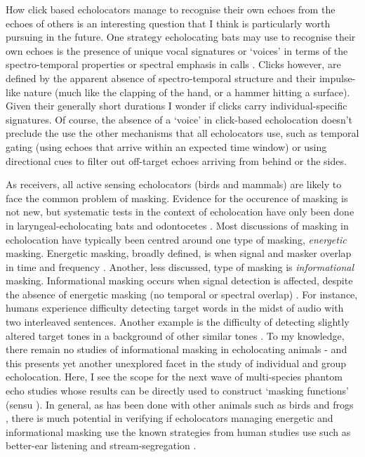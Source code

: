 \documentclass[
]{book}
\begin{document}
How click based echolocators manage to recognise their own echoes from the echoes of others is an interesting question that I think is particularly worth pursuing in the future. One strategy echolocating bats may use to recognise their own echoes is the presence of unique vocal signatures or `voices' in terms of the spectro-temporal properties or spectral emphasis in calls \citep{yovel-a, masters1995sonar}. Clicks however, are defined by the apparent absence of spectro-temporal structure \citep{pye1980echolocation} and their impulse-like nature (much like the clapping of the hand, or a hammer hitting a surface). Given their generally short durations I wonder if clicks carry individual-specific signatures. Of course, the absence of a `voice' in click-based echolocation doesn't preclude the use the other mechanisms that all echolocators use, such as temporal gating (using echoes that arrive within an expected time window) or using directional cues to filter out off-target echoes arriving from behind or the sides.

As receivers, all active sensing echolocators (birds and mammals) are likely to face the common problem of masking. Evidence for the occurence of masking is not new, but systematic tests in the context of echolocation have only been done in laryngeal-echolocating bats and odontocetes \citep{Nachtigall2014}. Most discussions of masking in echolocation have typically been centred around one type of masking, \emph{energetic} masking. Energetic masking, broadly defined, is when signal and masker overlap in time and frequency \citep{yost2007a, Culling2017}. Another, less discussed, type of masking is \emph{informational} masking. Informational masking occurs when signal detection is affected, despite the absence of energetic masking (no temporal or spectral overlap) \citep{Culling2017}. For instance, humans experience difficulty detecting target words in the midst of audio with two interleaved sentences. Another example is the difficulty of detecting slightly altered target tones in a background of other similar tones \citep{Kidd2017}. To my knowledge, there remain no studies of informational masking in echolocating animals - and this presents yet another unexplored facet in the study of individual and group echolocation. Here, I see the scope for the next wave of multi-species phantom echo studies \citep[eg.][]{m1989a, surlykke1992target, surlykke1996integration, siewert2004a} whose results can be directly used to construct `masking functions' (sensu \citet{beleyur2019modeling}). In general, as has been done with other animals such as birds and frogs \citep{bee2008a}, there is much potential in verifying if echolocators managing energetic and informational masking use the known strategies from human studies use such as better-ear listening and stream-segregation \citep{Culling2017}.
\end{document}
